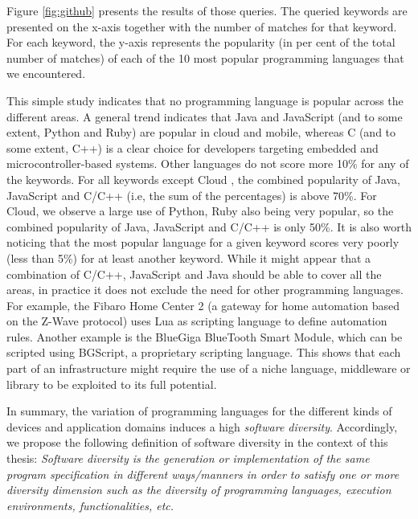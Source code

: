 Figure \ref{fig:github} presents the results of those queries. The queried keywords are presented on the x-axis together with the number of matches for that keyword. For each keyword, the y-axis represents the popularity (in per cent of the total number of matches) of each of the 10 most popular programming languages that we encountered.


This simple study indicates that no programming language is popular across the different areas. A general trend indicates that Java and JavaScript (and to some extent, Python and Ruby) are popular in cloud and mobile, whereas C (and to some extent, C++) is a clear choice for developers targeting embedded and microcontroller-based systems. Other languages do not score more 10\% for any of the keywords. 
For all keywords except Cloud , the combined popularity of Java, JavaScript and C/C++ (i.e, the sum
of the percentages) is above 70\%. For Cloud, we observe a large use of Python, Ruby also being very popular, so the combined popularity of Java, JavaScript and C/C++ is only 50\%. It is also worth noticing that the most popular language for a given keyword scores very poorly (less than 5\%) for at least another keyword. While it might appear that a combination of C/C++, JavaScript and Java should be able to cover all the areas, in practice it does not exclude the need for other programming languages. For example, the Fibaro Home Center 2 (a gateway for home automation based on the Z-Wave protocol) uses Lua as scripting language to define automation rules. Another example is the BlueGiga BlueTooth Smart Module, which can be scripted using BGScript, a proprietary scripting language. This shows that each part of an infrastructure might require the use of a niche language, middleware or library to be exploited to its full potential.


In summary, the variation of programming languages for the different kinds of devices and application domains induces a high \textit{software diversity}. Accordingly, we propose the following definition of software diversity in the context of this thesis: 
\textit{Software diversity is the generation or implementation of the same program specification in different ways/manners in order to satisfy one or more diversity dimension such as the diversity of programming languages, execution environments, functionalities, etc. }
		

